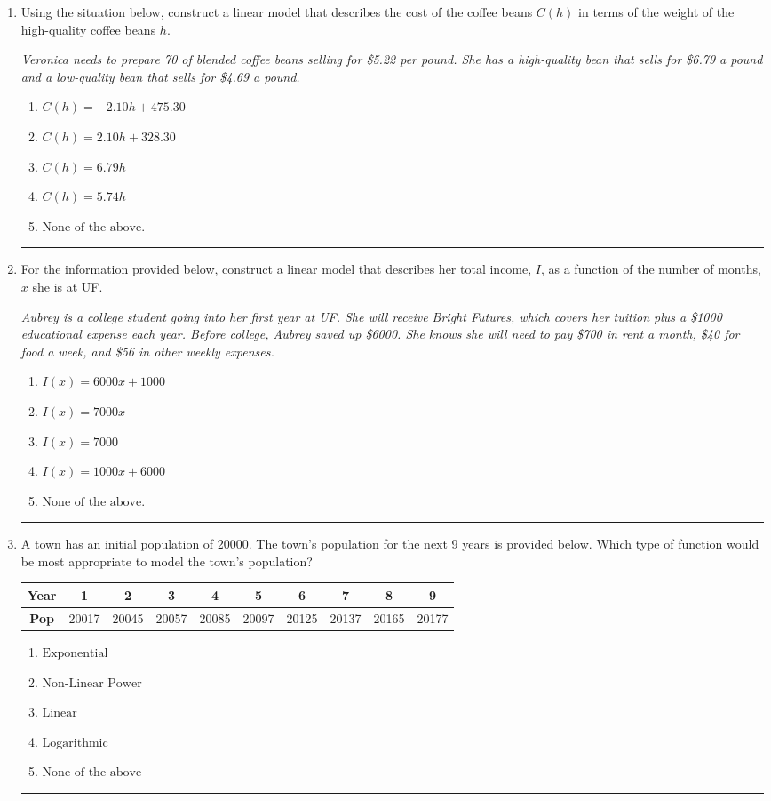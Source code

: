 \documentclass[14pt]{extbook}
\newcommand{\litem}[1]{\item#1\hspace*{-1cm}\rule{\textwidth}{0.4pt}}
\begin{document}
\begin{enumerate}
{\begin{enumerate}[label=\Alph*.]
\end{enumerate} }
\litem{
Using the situation below, construct a linear model that describes the cost of the coffee beans $C(h)$ in terms of the weight of the high-quality coffee beans $h$.
\begin{center}
    \textit{ Veronica needs to prepare 70 of blended coffee beans selling for \$5.22 per pound. She has a high-quality bean that sells for \$6.79 a pound and a low-quality bean that sells for \$4.69 a pound. }
\end{center}
\begin{enumerate}[label=\Alph*.]
\item \( C(h) = -2.10 h + 475.30 \)
\item \( C(h) = 2.10 h + 328.30 \)
\item \( C(h) = 6.79 h \)
\item \( C(h) = 5.74 h \)
\item \( \text{None of the above.} \)

\end{enumerate} }
\litem{
For the information provided below, construct a linear model that describes her total income, $I$, as a function of the number of months, $x$ she is at UF.
\begin{center}
    \textit{ Aubrey is a college student going into her first year at UF. She will receive Bright Futures, which covers her tuition plus a \$1000 educational expense each year. Before college, Aubrey saved up \$6000. She knows she will need to pay \$700 in rent a month, \$40 for food a week, and \$56 in other weekly expenses. }
\end{center}
\begin{enumerate}[label=\Alph*.]
\item \( I(x) = 6000 x + 1000 \)
\item \( I(x) = 7000 x \)
\item \( I(x) = 7000 \)
\item \( I(x) = 1000 x + 6000 \)
\item \( \text{None of the above.} \)

\end{enumerate} }
\litem{
A town has an initial population of 20000. The town's population for the next 9 years is provided below. Which type of function would be most appropriate to model the town's population?

\begin{tabular}{c|c|c|c|c|c|c|c|c|c}
\textbf{Year} &1 &2 &3 &4 &5 &6 &7 &8 &9\tabularnewline \hline
\textbf{Pop} &20017 &20045 &20057 &20085 &20097 &20125 &20137 &20165 &20177\end{tabular}\begin{enumerate}[label=\Alph*.]
\item \( \text{Exponential} \)
\item \( \text{Non-Linear Power} \)
\item \( \text{Linear} \)
\item \( \text{Logarithmic} \)
\item \( \text{None of the above} \)


\end{enumerate}}
\end{enumerate}
\end{document}
